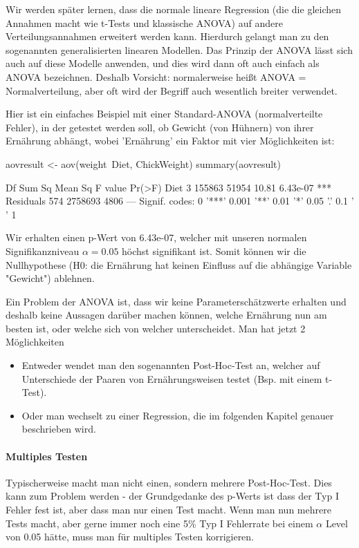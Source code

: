 \documentclass[a4paper,twoside]{tufte-book}\usepackage[]{graphicx}\usepackage[]{color}
\begin{document}
Wir werden später lernen, dass die normale lineare Regression (die die gleichen Annahmen macht wie t-Tests und klassische ANOVA) auf andere Verteilungsannahmen erweitert werden kann. Hierdurch gelangt man zu den sogenannten generalisierten linearen Modellen. Das Prinzip der ANOVA lässt sich auch auf diese Modelle anwenden, und dies wird dann oft auch einfach als ANOVA bezeichnen. Deshalb Vorsicht: normalerweise heißt ANOVA = Normalverteilung, aber oft wird der Begriff auch wesentlich breiter verwendet.

Hier ist ein einfaches Beispiel mit einer Standard-ANOVA (normalverteilte Fehler), in der getestet werden soll, ob Gewicht (von Hühnern) von ihrer Ernährung abhängt, wobei 'Ernährung' ein Faktor mit vier Möglichkeiten ist:

\begin{Schunk}
\begin{Sinput}
aovresult <- aov(weight~Diet, ChickWeight)
summary(aovresult)
\end{Sinput}
\begin{Soutput}
             Df  Sum Sq Mean Sq F value   Pr(>F)    
Diet          3  155863   51954   10.81 6.43e-07 ***
Residuals   574 2758693    4806                     
---
Signif. codes:  0 '***' 0.001 '**' 0.01 '*' 0.05 '.' 0.1 ' ' 1
\end{Soutput}
\end{Schunk}

Wir erhalten einen p-Wert von 6.43e-07, welcher mit unseren normalen Signifikanzniveau $\alpha=0.05$ höchst signifikant ist. Somit können wir die Nullhypothese (H0: die Ernährung hat keinen Einfluss auf die abhängige Variable "Gewicht") ablehnen. 

Ein Problem der ANOVA ist, dass wir keine Parameterschätzwerte erhalten und deshalb keine Aussagen darüber machen können, welche Ernährung nun am besten ist, oder welche sich von welcher unterscheidet. Man hat jetzt 2 Möglichkeiten

\begin{itemize}
\item Entweder wendet man den sogenannten Post-Hoc-Test an, welcher auf Unterschiede der Paaren von Ernährungsweisen testet (Bsp. mit einem t-Test).
\item Oder man wechselt zu einer Regression, die im folgenden Kapitel genauer beschrieben wird.
\end{itemize}

\paragraph{Multiples Testen} Typischerweise macht man nicht einen, sondern mehrere Post-Hoc-Test. Dies kann zum Problem werden - der Grundgedanke des p-Werts ist dass der Typ I Fehler fest ist, aber dass man nur einen Test macht. Wenn man nun mehrere Tests macht, aber gerne immer noch eine 5\% Typ I Fehlerrate bei einem $\alpha$ Level von 0.05 hätte, muss man für multiples Testen korrigieren.  
\end{document}
